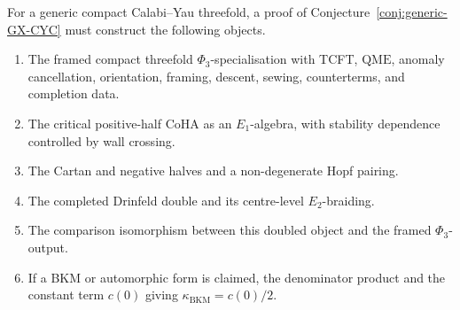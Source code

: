 \documentclass[11pt]{amsart}
\theoremstyle{definition}
\providecommand{\kBKM}{\kappa_{\mathrm{BKM}}}
\providecommand{\Eone}{E_1}
\providecommand{\Etwo}{E_2}
\providecommand{\QME}{\mathrm{QME}}
\begin{document}
For a generic compact Calabi--Yau threefold, a proof of
Conjecture~\ref{conj:generic-GX-CYC} must construct the following
objects.
\begin{enumerate}
\item The framed compact threefold \(\Phi_3\)-specialisation with TCFT,
  \(\QME\), anomaly cancellation, orientation, framing, descent, sewing,
  counterterms, and completion data.
\item The critical positive-half CoHA as an \(\Eone\)-algebra, with
  stability dependence controlled by wall crossing.
\item The Cartan and negative halves and a non-degenerate Hopf pairing.
\item The completed Drinfeld double and its centre-level
  \(\Etwo\)-braiding.
\item The comparison isomorphism between this doubled object and the
  framed \(\Phi_3\)-output.
\item If a BKM or automorphic form is claimed, the denominator product
  and the constant term \(c(0)\) giving \(\kBKM=c(0)/2\).
\end{enumerate}
\end{document}
